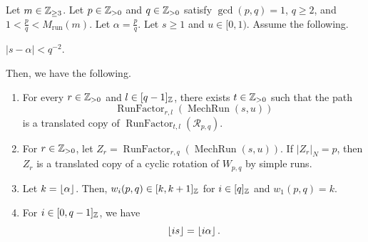 \begin{lemma}\label{lem:rational-mechanical}
Let $m\in\mathbb Z_{\ge3}$.
Let $p\in\mathbb Z_{>0}$ and $q\in\mathbb Z_{>0}$ satisfy $\gcd(p,q)=1$, $q\ge2$, and
$1<\frac pq<M_{\mathrm{run}}(m)$.
Let $\alpha=\frac pq$.
Let $s\ge1$ and $u\in[0,1)$. Assume the following.
\begin{hypotheses}
\item\label{hyp:rational-mechanical-slope} $|s-\alpha|<q^{-2}$.
\end{hypotheses}
Then, we have the following.

\begin{enumerate}
\item\label{c:rational-mechanical-short} For every $r\in\mathbb Z_{>0}$ and $l\in[q-1]_{\mathbb Z}$, there exists $t\in\mathbb Z_{>0}$ such that the path
\[
 \operatorname{RunFactor}_{r,l}(\operatorname{MechRun}(s,u))
\]
is a translated copy of $\operatorname{RunFactor}_{t,l}(\mathcal R_{p,q})$.
\item\label{c:rational-mechanical-period} For $r\in\mathbb Z_{>0}$, let
$Z_r=\operatorname{RunFactor}_{r,q}(\operatorname{MechRun}(s,u))$.
If $|Z_r|_N=p$, then $Z_r$ is a translated copy of a cyclic rotation
of $W_{p,q}$ by simple runs.
\item\label{c:rational-mechanical-lengths} Let $k=\left\lfloor\alpha\right\rfloor$.
Then, $w_i(p,q)\in[k,k+1]_{\mathbb Z}$ for $i\in[q]_{\mathbb Z}$ and $w_1(p,q)=k$.
\item\label{c:rational-mechanical-zero-phase} For $i\in[0,q-1]_{\mathbb Z}$, we have
\[
 \left\lfloor is\right\rfloor=\left\lfloor i\alpha\right\rfloor.
\]
\end{enumerate}
\end{lemma}
